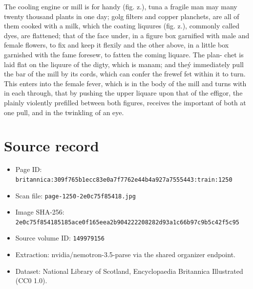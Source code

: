 \documentclass{article}
\begin{document}
The cooling engine or mill is for handy (fig. z.), tuna a fragile man may many twenty thousand plants in one day; golg filters and copper planchets, are all of them cooked with a milk, which the coating liquures (fig. z.), commonly called dyes, are flattened; that of the face under, in a figure box garnified with male and female flowers, to fix and keep it flexily and the other above, in a little box garnished with the fame foresew, to fatten the coming liquare. The plan- chet is laid flat on the liquure of the digty, which is manam; and theý immediately pull the bar of the mill by its cords, which can confer the frewef fet within it to turn. This enters into the female fever, which is in the body of the mill and turns with in each through, that by pushing the upper liquare upon that of the effigor, the plainly violently prefilled between both figures, receives the important of both at one pull, and in the twinkling of an eye.

\section*{Source record}
\begin{itemize}
\item Page ID: \texttt{britannica:309f765b1ecc83e0a7f7762e44b4a927a7555443:train:1250}
\item Scan file: \texttt{page-1250-2e0c75f85418.jpg}
\item Image SHA-256: \texttt{2e0c75f854185185ace0f165eea2b904222208282d93a1c66b97c9b5c42f5c95}
\item Source volume ID: \texttt{149979156}
\item Extraction: nvidia/nemotron-3.5-parse via the shared organizer endpoint.
\item Dataset: National Library of Scotland, Encyclopaedia Britannica Illustrated (CC0 1.0).
\end{itemize}
\end{document}
